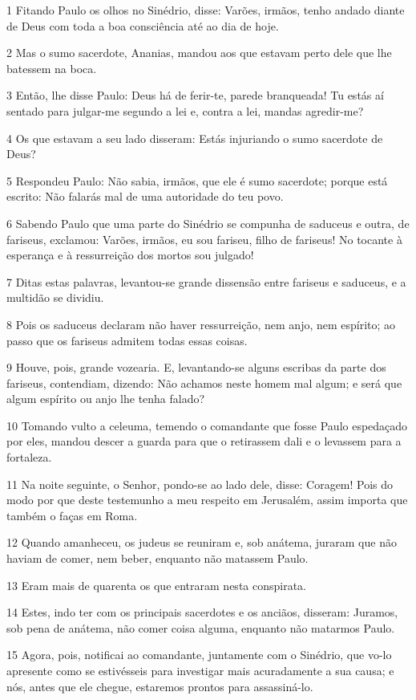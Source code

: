\par 1 Fitando Paulo os olhos no Sinédrio, disse: Varões, irmãos, tenho andado diante de Deus com toda a boa consciência até ao dia de hoje.
\par 2 Mas o sumo sacerdote, Ananias, mandou aos que estavam perto dele que lhe batessem na boca.
\par 3 Então, lhe disse Paulo: Deus há de ferir-te, parede branqueada! Tu estás aí sentado para julgar-me segundo a lei e, contra a lei, mandas agredir-me?
\par 4 Os que estavam a seu lado disseram: Estás injuriando o sumo sacerdote de Deus?
\par 5 Respondeu Paulo: Não sabia, irmãos, que ele é sumo sacerdote; porque está escrito: Não falarás mal de uma autoridade do teu povo.
\par 6 Sabendo Paulo que uma parte do Sinédrio se compunha de saduceus e outra, de fariseus, exclamou: Varões, irmãos, eu sou fariseu, filho de fariseus! No tocante à esperança e à ressurreição dos mortos sou julgado!
\par 7 Ditas estas palavras, levantou-se grande dissensão entre fariseus e saduceus, e a multidão se dividiu.
\par 8 Pois os saduceus declaram não haver ressurreição, nem anjo, nem espírito; ao passo que os fariseus admitem todas essas coisas.
\par 9 Houve, pois, grande vozearia. E, levantando-se alguns escribas da parte dos fariseus, contendiam, dizendo: Não achamos neste homem mal algum; e será que algum espírito ou anjo lhe tenha falado?
\par 10 Tomando vulto a celeuma, temendo o comandante que fosse Paulo espedaçado por eles, mandou descer a guarda para que o retirassem dali e o levassem para a fortaleza.
\par 11 Na noite seguinte, o Senhor, pondo-se ao lado dele, disse: Coragem! Pois do modo por que deste testemunho a meu respeito em Jerusalém, assim importa que também o faças em Roma.
\par 12 Quando amanheceu, os judeus se reuniram e, sob anátema, juraram que não haviam de comer, nem beber, enquanto não matassem Paulo.
\par 13 Eram mais de quarenta os que entraram nesta conspirata.
\par 14 Estes, indo ter com os principais sacerdotes e os anciãos, disseram: Juramos, sob pena de anátema, não comer coisa alguma, enquanto não matarmos Paulo.
\par 15 Agora, pois, notificai ao comandante, juntamente com o Sinédrio, que vo-lo apresente como se estivésseis para investigar mais acuradamente a sua causa; e nós, antes que ele chegue, estaremos prontos para assassiná-lo.
